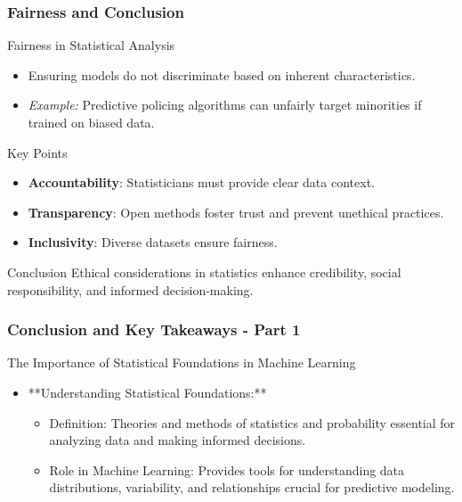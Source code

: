 \documentclass{beamer}
\begin{document}
\begin{frame}[fragile]
    \frametitle{Fairness and Conclusion}
    \begin{block}{Fairness in Statistical Analysis}
        \begin{itemize}
            \item Ensuring models do not discriminate based on inherent characteristics.
            \item \textit{Example:} Predictive policing algorithms can unfairly target minorities if trained on biased data.
        \end{itemize}
    \end{block}

    \begin{block}{Key Points}
        \begin{itemize}
            \item \textbf{Accountability}: Statisticians must provide clear data context.
            \item \textbf{Transparency}: Open methods foster trust and prevent unethical practices.
            \item \textbf{Inclusivity}: Diverse datasets ensure fairness.
        \end{itemize}
    \end{block}

    \begin{block}{Conclusion}
        Ethical considerations in statistics enhance credibility, social responsibility, and informed decision-making.
    \end{block}
\end{frame}

\begin{frame}[fragile]
    \frametitle{Conclusion and Key Takeaways - Part 1}
    \begin{block}{The Importance of Statistical Foundations in Machine Learning}
        \begin{itemize}
            \item **Understanding Statistical Foundations:**
                \begin{itemize}
                    \item Definition: Theories and methods of statistics and probability essential for analyzing data and making informed decisions.
                    \item Role in Machine Learning: Provides tools for understanding data distributions, variability, and relationships crucial for predictive modeling.
                \end{itemize}
        \end{itemize}
    \end{block}
\end{frame}
\end{document}

